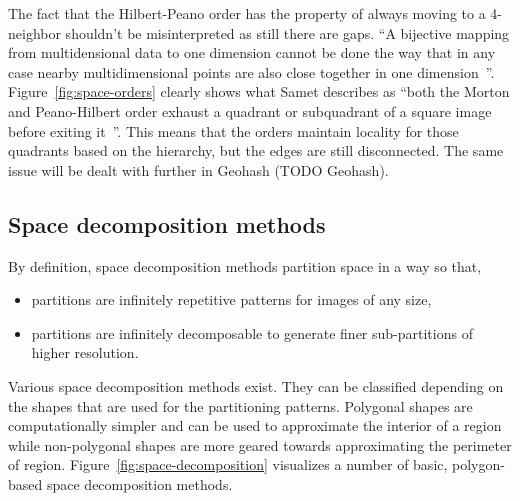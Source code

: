 The fact that the Hilbert-Peano order has the property of always moving to a 4-neighbor shouldn't be misinterpreted as still there are gaps. ``A bijective mapping from multidensional data to one dimension cannot be done the way that in any case nearby multidimensional points are also close together in one dimension~\cite{Tropf81multidimensional}''. Figure~\ref{fig:space-orders} clearly shows what Samet describes as ``both the Morton and Peano-Hilbert order exhaust a quadrant or subquadrant of a square image before exiting it~\cite{Samet90spatialdata}''. This means that the orders maintain locality for those quadrants based on the hierarchy, but the edges are still disconnected. The same issue will be dealt with further in Geohash (TODO Geohash).


\subsection{Space decomposition methods}

By definition, space decomposition methods partition space in a way so that,
\begin{itemize}
\item partitions are infinitely repetitive patterns for images of any size,
\item partitions are infinitely decomposable to generate finer sub-partitions of higher resolution.~\cite{Samet90spatialdata}
\end{itemize}

Various space decomposition methods exist. They can be classified depending on the shapes that are used for the partitioning patterns. Polygonal shapes are computationally simpler and can be used to approximate the interior of a region while non-polygonal shapes are more geared towards approximating the perimeter of region. Figure~\ref{fig:space-decomposition} visualizes a number of basic, polygon-based space decomposition methods. 

